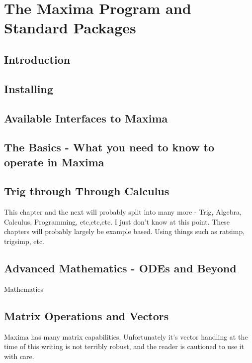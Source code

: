 \documentclass[oneside,english]{book}
\begin{document}
\part{The Maxima Program and Standard Packages}

\chapter{Introduction}
  

\chapter{Installing}
  

\chapter{Available Interfaces to Maxima}
  

\chapter{The Basics - What you need to know to operate in Maxima}
  

\chapter{Trig through Through Calculus}

    This chapter and the next will probably split into many more - Trig,
    Algebra, Calculus, Programming, etc,etc,etc. I just don't know at
    this point. These chapters will probably largely be example based.
    Using things such as ratsimp, trigsimp, etc.
   
   
 
\chapter{Advanced Mathematics - ODEs and Beyond}

    Mathematics

\chapter{Matrix Operations and Vectors}

    Maxima has many matrix capabilities. Unfortunately it's vector handling
    at the time of this writing is not terribly robust, and the reader
    is cautioned to use it with care.
\end{document}
